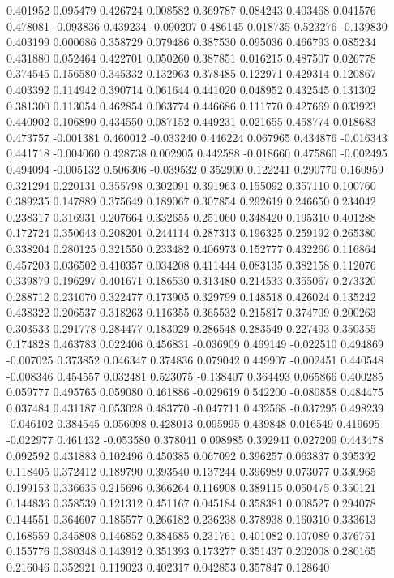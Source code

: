 0.401952
0.095479
0.426724
0.008582
0.369787
0.084243
0.403468
0.041576
0.478081
-0.093836
0.439234
-0.090207
0.486145
0.018735
0.523276
-0.139830
0.403199
0.000686
0.358729
0.079486
0.387530
0.095036
0.466793
0.085234
0.431880
0.052464
0.422701
0.050260
0.387851
0.016215
0.487507
0.026778
0.374545
0.156580
0.345332
0.132963
0.378485
0.122971
0.429314
0.120867
0.403392
0.114942
0.390714
0.061644
0.441020
0.048952
0.432545
0.131302
0.381300
0.113054
0.462854
0.063774
0.446686
0.111770
0.427669
0.033923
0.440902
0.106890
0.434550
0.087152
0.449231
0.021655
0.458774
0.018683
0.473757
-0.001381
0.460012
-0.033240
0.446224
0.067965
0.434876
-0.016343
0.441718
-0.004060
0.428738
0.002905
0.442588
-0.018660
0.475860
-0.002495
0.494094
-0.005132
0.506306
-0.039532
0.352900
0.122241
0.290770
0.160959
0.321294
0.220131
0.355798
0.302091
0.391963
0.155092
0.357110
0.100760
0.389235
0.147889
0.375649
0.189067
0.307854
0.292619
0.246650
0.234042
0.238317
0.316931
0.207664
0.332655
0.251060
0.348420
0.195310
0.401288
0.172724
0.350643
0.208201
0.244114
0.287313
0.196325
0.259192
0.265380
0.338204
0.280125
0.321550
0.233482
0.406973
0.152777
0.432266
0.116864
0.457203
0.036502
0.410357
0.034208
0.411444
0.083135
0.382158
0.112076
0.339879
0.196297
0.401671
0.186530
0.313480
0.214533
0.355067
0.273320
0.288712
0.231070
0.322477
0.173905
0.329799
0.148518
0.426024
0.135242
0.438322
0.206537
0.318263
0.116355
0.365532
0.215817
0.374709
0.200263
0.303533
0.291778
0.284477
0.183029
0.286548
0.283549
0.227493
0.350355
0.174828
0.463783
0.022406
0.456831
-0.036909
0.469149
-0.022510
0.494869
-0.007025
0.373852
0.046347
0.374836
0.079042
0.449907
-0.002451
0.440548
-0.008346
0.454557
0.032481
0.523075
-0.138407
0.364493
0.065866
0.400285
0.059777
0.495765
0.059080
0.461886
-0.029619
0.542200
-0.080858
0.484475
0.037484
0.431187
0.053028
0.483770
-0.047711
0.432568
-0.037295
0.498239
-0.046102
0.384545
0.056098
0.428013
0.095995
0.439848
0.016549
0.419695
-0.022977
0.461432
-0.053580
0.378041
0.098985
0.392941
0.027209
0.443478
0.092592
0.431883
0.102496
0.450385
0.067092
0.396257
0.063837
0.395392
0.118405
0.372412
0.189790
0.393540
0.137244
0.396989
0.073077
0.330965
0.199153
0.336635
0.215696
0.366264
0.116908
0.389115
0.050475
0.350121
0.144836
0.358539
0.121312
0.451167
0.045184
0.358381
0.008527
0.294078
0.144551
0.364607
0.185577
0.266182
0.236238
0.378938
0.160310
0.333613
0.168559
0.345808
0.146852
0.384685
0.231761
0.401082
0.107089
0.376751
0.155776
0.380348
0.143912
0.351393
0.173277
0.351437
0.202008
0.280165
0.216046
0.352921
0.119023
0.402317
0.042853
0.357847
0.128640
